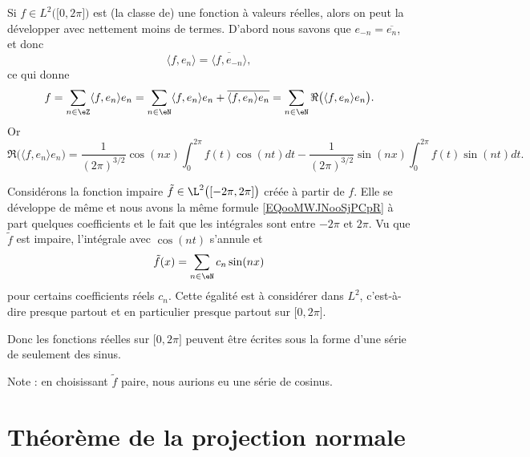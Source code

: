 	\begin{example}     \label{EXooQDWUooLtuIOm}
		Si \( f\in L^2\big( \mathopen[ 0 , 2\pi \mathclose] \big)\) est (la classe de) une fonction à valeurs réelles, alors on peut la développer avec nettement moins de termes. D'abord nous savons que \( e_{-n}=\overline{ e_n }\), et donc
		\begin{equation}
			\langle f, e_n\rangle =\overline{ \langle f, e_{-n}\rangle  },
		\end{equation}
		ce qui donne
		\begin{equation}
			f=\sum_{n\in\eZ}\langle f, e_n\rangle e_n=\sum_{n\in \eN}\langle f, e_n\rangle e_n +\overline{ \langle f, e_n\rangle e_n }=\sum_{n\in \eN}\Re\big( \langle f, e_n\rangle e_n \big).
		\end{equation}
		Or
		\begin{equation}        \label{EQooMWJNooSjPCpR}
			\Re\big( \langle f, e_n\rangle e_n \big)=\frac{1}{ (2\pi)^{3/2} }\cos(nx)\int_0^{2\pi}f(t)\cos(nt)dt-\frac{1}{ (2\pi)^{3/2} }\sin(nx)\int_0^{2\pi}f(t)\sin(nt)dt.
		\end{equation}

		Considérons la fonction impaire \( \tilde f\in\L^2\big( [-2\pi,2\pi] \big)\) créée à partir de \( f\). Elle se développe de même et nous avons la même formule \eqref{EQooMWJNooSjPCpR} à part quelques coefficients et le fait que les intégrales sont entre \( -2\pi\) et \( 2\pi\). Vu que \( \tilde f\) est impaire, l'intégrale avec \( \cos(nt)\) s'annule et
		\begin{equation}
			\tilde f(x)=\sum_{n\in \eN}c_n\sin(nx)
		\end{equation}
		pour certains coefficients réels \( c_n\). Cette égalité est à considérer dans \( L^2\), c'est-à-dire presque partout et en particulier presque partout sur \( \mathopen[ 0 , 2\pi \mathclose]\).

		Donc les fonctions réelles sur \( \mathopen[ 0 , 2\pi \mathclose]\) peuvent être écrites sous la forme d'une série de seulement des sinus.

		Note : en choisissant \( \tilde f\) paire, nous aurions eu une série de cosinus.
	\end{example}

	\section{Théorème de la projection normale}

